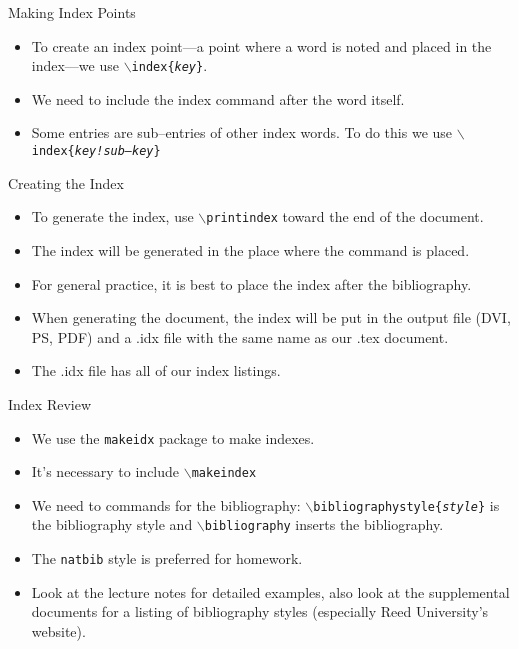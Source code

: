 \documentclass[pdf]{prosper}
\begin{document}
\begin{slide}{Making Index Points}
	\begin{itemize}
		\item To create an index point---a point where a word is noted and placed in the index---we use \texttt{$\backslash$index\{\textit{key}\}}.
		\item We need to include the index command after the word itself.
			\begin{itemize}
				\item e.g. \texttt{Maxwell's equations$\backslash$\{Maxwell\} are four equations\ldots
			\end{itemize}
		\item Some entries are sub--entries of other index words. To do this we use \texttt{$\backslash$index\{\textit{key!sub--key}\}}
	\end{itemize}
\end{slide}
\begin{slide}{Creating the Index}
	\begin{itemize}
		\item To generate the index, use \texttt{$\backslash$printindex} toward the end of the document.
		\item The index will be generated in the place where the command is placed.
		\item For general practice, it is best to place the index after the bibliography.
		\item When generating the document, the index will be put in the output file (DVI, PS, PDF) and a .idx file with the same name as our .tex document.
		\item The .idx file has all of our index listings.
	\end{itemize}
\end{slide}
\begin{slide}{Index Review}
	\begin{itemize}
		\item We use the \texttt{makeidx} package to make indexes.
		\item It's necessary to include \texttt{$\backslash$makeindex} 
		\item We need to commands for the bibliography: \texttt{$\backslash$bibliographystyle\{\textit{style}\}} is the bibliography style and \texttt{$\backslash$bibliography} inserts the bibliography.
		\item The \texttt{natbib} style is preferred for homework.
		\item Look at the lecture notes for detailed examples, also look at the supplemental documents for a listing of bibliography styles (especially Reed University's website).
	\end{itemize}
\end{slide}
\end{document}
